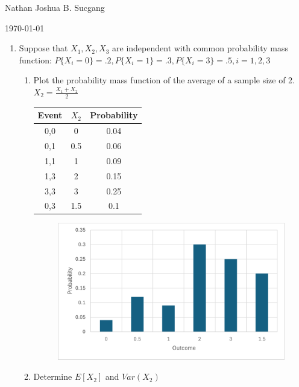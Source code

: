 \documentclass{article}
\begin{document}
Nathan Joshua B. Sucgang

\today

\begin{enumerate}
    \item Suppose that $X_1, X_2, X_3$ are independent with common probability mass function: $P\{X_i = 0 \} = .2, P\{X_i = 1 \} = .3, P\{X_i = 3 \} = .5, i = 1,2,3$
    \begin{enumerate}
        \item Plot the probability mass function of the average of a sample size of 2. $X_2 = \frac{X_1+X_2}{2}$
        
        \begin{tabular}{|c|c|c|}
                \hline
                \textbf{Event} & \bf{$X_2$} & \textbf{Probability} \\
                \hline
                0,0 & 0 & 0.04 \\
                0,1 & 0.5 & 0.06 \\
                1,1 & 1 & 0.09 \\
                1,3 & 2 & 0.15 \\
                3,3 & 3 & 0.25 \\
                0,3 & 1.5 & 0.1 \\
                \hline
                \end{tabular}
                \begin{figure}[!htbp]
                    \centerline{\includegraphics[keepaspectratio]{Picture/Picture1.png}}
                    \label{fig1}
                \end{figure}

            
        \item Determine $E[X_2]$ and $Var(X_2)$
        

\end{enumerate}
\end{enumerate}
\end{document}
